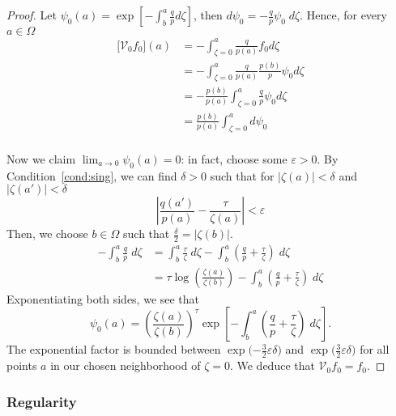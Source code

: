 \documentclass{article}
\theoremstyle{plain}
\newcommand{\hardpart}{\mathcal{V}_0}
\begin{document}
\begin{proof}
    Let $\psi_0(a)= \exp\left[-\int_{b}^{a}\frac{q}{p} d\zeta\right]$, then $ d \psi_0 = -\frac{q}{p} \psi_0\;d\zeta $. Hence, for every $a\in\Omega$ 
    \begin{align*}
        \big[\hardpart f_0\big](a) &= - \int_{\zeta=0}^{a} \frac{q}{p(a)} f_0 d\zeta \\
        &= - \int_{\zeta=0}^{a} \frac{q}{p(a)} \frac{p(b)}{p}\psi_0 d\zeta \\
        &= - \frac{p(b)}{p(a)}  \int_{\zeta=0}^{a} \frac{q}{p} \psi_0 d\zeta\\
        &= \frac{p(b)}{p(a)}  \int_{\zeta=0}^{a} d\psi_0  \\
    \end{align*}

    Now we claim $\lim_{a\to 0}\psi_0(a)=0$: in fact, choose some $\varepsilon>0$. By Condition~\eqref{cond:sing}, we can find $\delta>0$ such that for $|\zeta(a)|<\delta$ and $|\zeta(a')|<\delta$
\begin{equation}\label{eqn:limit_h1}
\left|\frac{q(a')}{p(a)} - \frac{\tau}{\zeta(a)}\right|<\varepsilon
\end{equation}
 Then, we choose $b\in\Omega$ such that $\tfrac{\delta}{2}=|\zeta(b)|$.
\begin{align*}
-\int_b^a \frac{q}{p}\;d\zeta & = \int_b^a \frac{\tau}{\zeta}\;d\zeta - \int_b^a \left( \frac{q}{p} + \frac{\tau}{\zeta} \right)\;d\zeta \\
& = \tau \log\left(\frac{\zeta(a)}{\zeta(b)}\right) - \int_b^a \left( \frac{q}{p} + \frac{\tau}{\zeta} \right)\;d\zeta
\end{align*}
Exponentiating both sides, we see that
\[ \psi_0(a) = \left(\frac{\zeta(a)}{\zeta(b)}\right)^\tau \exp\left[-\int_b^a \left( \frac{q}{p} + \frac{\tau}{\zeta} \right)\;d\zeta\right]. \]
The exponential factor is bounded between $\exp\big({-\tfrac{3}{2}\varepsilon\delta}\big)$ and $\exp\big(\tfrac{3}{2}\varepsilon\delta\big)$ for all points $a$ in our chosen neighborhood of $\zeta = 0$. We deduce that $\hardpart  f_0=f_0$. 
\end{proof}


\subsubsection{Regularity}\label{sec:asymptotics}
\end{document}
